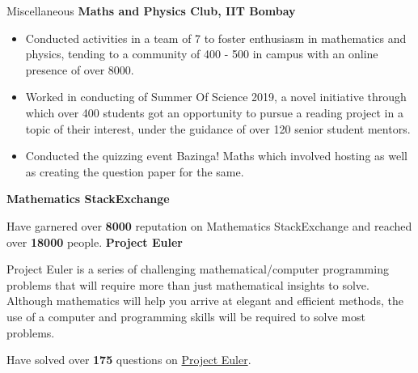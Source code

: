 
\begin{rubric}{Miscellaneous}
\entry*[] \textbf{Maths and Physics Club, IIT Bombay}
\vspace{-2mm}
\begin{itemize}%
	\setlength\itemsep{-0.4em}
    \item Conducted activities in a team of 7 to foster enthusiasm in mathematics and physics, tending to a community of 400 - 500 in campus with an online presence of over 8000.
    \item Worked in conducting of Summer Of Science 2019, a novel initiative through which over 400 students got an opportunity to pursue a reading project in a topic of their interest, under the guidance of over 120 senior student mentors.
    \item Conducted the quizzing event Bazinga! Maths which involved hosting as well as creating the question paper for the same. \vspace{-5mm}
\end{itemize}
%
\entry*[] \textbf{Mathematics StackExchange}

\hspace{-1mm}

Have garnered over \textbf{8000} reputation on Mathematics StackExchange and reached over \textbf{18000} people.
%
\entry*[] \textbf{Project Euler}

Project Euler is a series of challenging mathematical/computer programming problems that will require more than just mathematical insights to solve. Although mathematics will help you arrive at elegant and efficient methods, the use of a computer and programming skills will be required to solve most problems.

Have solved over \textbf{175} questions on \href{https://projecteuler.net/}{Project Euler}.
\end{rubric}